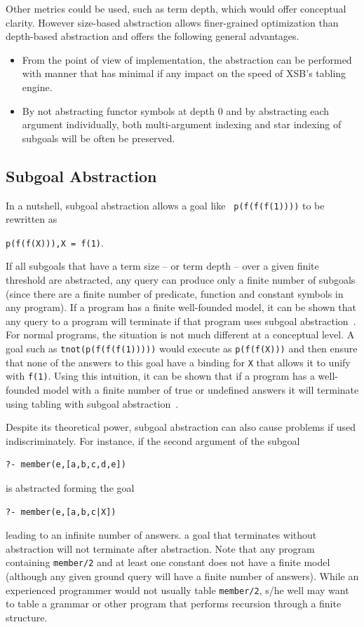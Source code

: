 Other metrics could be used, such as term depth, which would offer
conceptual clarity.  However size-based abstraction allows
finer-grained optimization than depth-based abstraction and offers the
following general advantages.
\begin{itemize}
\item From the point of view of implementation, the abstraction can be
  performed with manner that has minimal if any impact on the speed of
  XSB's tabling engine.
\item By not abstracting functor symbols at depth 0 and by abstracting
  each argument individually, both multi-argument indexing and star
  indexing of subgoals will be often be preserved.
\end{itemize}

\subsection{Subgoal Abstraction} \label{sec:subg-abs}
%
In a nutshell, subgoal abstraction allows a goal like {\tt
  p(f(f(f(1))))} to be rewritten as 

{\tt p(f(f(X))),X = f(1)}.  

\noindent
If all subgoals that have a term size -- or term depth -- over a given
finite threshold are abstracted, any query can produce only a finite
number of subgoals (since there are a finite number of predicate,
function and constant symbols in any program). If a program has a
finite well-founded model, it can be shown that any query to a program
will terminate if that program uses subgoal abstraction~\cite{RigS14}.
%
For normal programs, the situation is not much different at a
conceptual level.  A goal such as {\tt tnot(p(f(f(f(1)))))} would
execute as {\tt p(f(f(X)))} and then ensure that none of the answers
to this goal have a binding for {\tt X} that allows it to unify with
{\tt f(1)}.  Using this intuition, it can be shown that if a program
has a well-founded model with a finite number of true or undefined
answers it will terminate using tabling with subgoal
abstraction~\cite{RigS13,RigS14}.

Despite its theoretical power, subgoal abstraction can also cause
problems if used indiscriminately.  For instance, if the second
argument of the subgoal
%
\begin{verbatim}
?- member(e,[a,b,c,d,e])
\end{verbatim}
%
is abstracted forming the goal
%
\begin{verbatim}
?- member(e,[a,b,c|X])
\end{verbatim}
%
leading to an infinite number of answers.  a goal that terminates
without abstraction will not terminate after abstraction.  Note that
any program containing {\tt member/2} and at least one constant does
not have a finite model (although any given ground query will have a
finite number of answers).  While an experienced programmer would not
usually table {\tt member/2}, s/he well may want to table a grammar or
other program that performs recursion through a finite structure.

